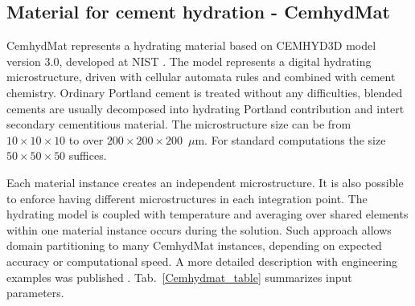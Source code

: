 \documentclass[a4paper]{article}
\begin{document}
\subsection{Material for cement hydration - CemhydMat}
\label{Cemhyd}
CemhydMat represents a hydrating material based on CEMHYD3D model version 3.0,
developed at NIST \cite{NISTIR7232}. The model represents a digital hydrating
microstructure, driven with cellular automata rules and combined with cement
chemistry. Ordinary Portland cement is treated without any difficulties, blended
cements are usually decomposed into hydrating Portland contribution and intert
secondary cementitious material. The microstructure size can be from
$10\times10\times10$ to over $200\times200\times200$~$\mu$m. For standard
computations the size $50\times50\times50$ suffices.

Each material instance creates an independent microstructure. It is also
possible to enforce having different microstructures in each integration point.
The hydrating model is coupled with temperature and averaging over shared
elements within one material instance occurs during the solution. Such approach
allows domain partitioning to many CemhydMat instances, depending on expected
accuracy or computational speed. A more detailed description with engineering
examples was published \cite{Smilauer:09}. Tab.~\ref{Cemhydmat_table} summarizes input parameters.
\end{document}
